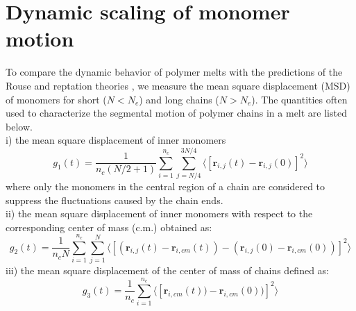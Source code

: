 \documentclass[pre,showpacs,notitlepage,twocolumn]{revtex4-1}
\begin{document}
 \section*{Dynamic scaling of monomer motion}
 \iffalse
The key  idea of reptation theory is that  the molecular
crowding confines the thermal fluctuations of a polymer chain to a
tube-shaped region of space along the coarse axis of the polymer. Each polymer chain is expected to move
back and forth (reptation) along the contour of an imaginary tube with  a diameter $d_T  \approx N_e^1/2  \ell_b  \sim   R_e (N_e)$  and a contour  
length $L^{(pp)}$ around the so-called primitive path. \fi

To compare the dynamic behavior of  polymer melts with the  predictions of  the Rouse and reptation theories \cite{polymerDoi}, we measure
  the mean square displacement (MSD) of monomers for  short ($N<N_e$) and  long chains ($N>N_e$). The quantities  often used to characterize the segmental motion of
polymer chains in a melt are listed below. \\
i) the mean square displacement of inner monomers  
\begin{equation}
 g_1(t)=\frac{1}{n_c (N/2+1)}  \sum_{i=1}^{n_c} \sum_{j=N/4}^{3N/4} \langle [\mathbf{r}_{i,j}(t)-\mathbf{r}_{i,j}(0)]^2 \rangle 
\end{equation}
where only the monomers in the central region of a chain are considered to suppress the fluctuations caused by the chain ends.  \\
ii) the mean square displacement of inner monomers with respect to
the corresponding center of mass (c.m.)  obtained as:
\begin{equation}
 g_2(t)=\frac{1}{n_c N}  \sum_{i=1}^{n_c} \sum_{j=1}^{N} \langle [(\mathbf{r}_{i,j}(t)-\mathbf{r}_{i,cm}(t))-(\mathbf{r}_{i,j}(0)-\mathbf{r}_{i,cm}(0))]^2 \rangle 
\end{equation}
  iii) the mean square displacement of the center of mass of chains defined as:
\begin{equation}
 g_3(t)=\frac{1}{n_c}  \sum_{i=1}^{n_c}  \langle [\mathbf{r}_{i,cm}(t))-\mathbf{r}_{i,cm}(0))]^2 \rangle 
\end{equation}
\end{document}
